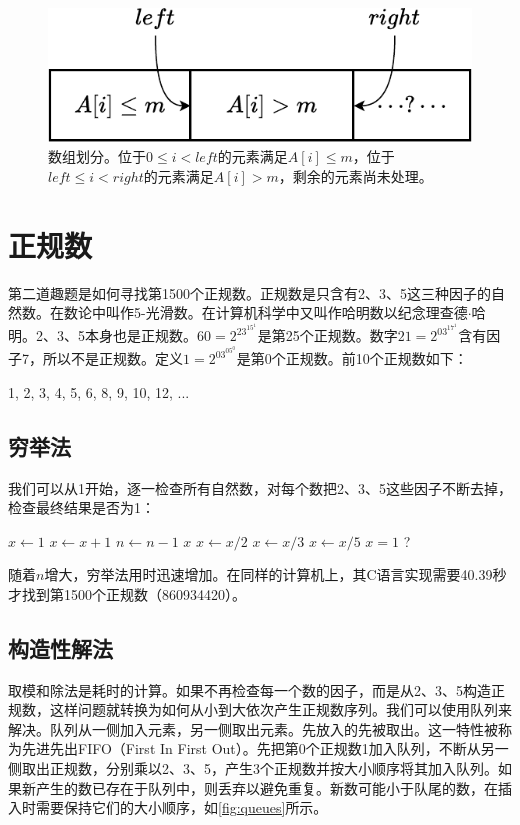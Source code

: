 \documentclass[b5paper]{ctexart}
\begin{document}
\begin{figure}[htbp]
  \centering
  \includegraphics[scale=0.7]{img/partition-by}  %
  \caption{数组划分。位于$0 \leq i < left$的元素满足$A[i] \leq m$，位于$left \leq i < right$的元素满足$A[i] > m$，剩余的元素尚未处理。}
  \label{fig:divide}
\end{figure}

\section*{正规数}

第二道趣题是如何寻找第1500个正规数。正规数是只含有2、3、5这三种因子的自然数。在数论中叫作5-光滑数。在计算机科学中又叫作哈明数以纪念理查德$\cdot$哈明。2、3、5本身也是正规数。$60 = 2^23^15^1$是第25个正规数。数字$21 = 2^03^17^1$含有因子7，所以不是正规数。定义$1=2^03^05^0$是第0个正规数。前10个正规数如下：

1, 2, 3, 4, 5, 6, 8, 9, 10, 12, ...

\subsection*{穷举法}
我们可以从1开始，逐一检查所有自然数，对每个数把2、3、5这些因子不断去掉，检查最终结果是否为1：

\begin{algorithmic}[1]
  \State $x \gets 1$
    \State $x \gets x + 1$
      \State $n \gets n - 1$
    \EndIf
  \EndWhile
  \State \Return $x$
\EndFunction
\Statex
{}
    \State $x \gets x / 2$
  \EndWhile
    \State $x \gets x / 3$
  \EndWhile
    \State $x \gets x / 5$
  \EndWhile
  \State \Return $x = 1$ ?
\EndFunction
\end{algorithmic}

随着$n$增大，穷举法用时迅速增加。在同样的计算机上，其C语言实现需要40.39秒才找到第1500个正规数（860934420）。

\subsection*{构造性解法}
取模和除法是耗时的计算\cite{Bentley}。如果不再检查每一个数的因子，而是从2、3、5构造正规数，这样问题就转换为如何从小到大依次产生正规数序列。我们可以使用队列来解决。队列从一侧加入元素，另一侧取出元素。先放入的先被取出。这一特性被称为先进先出FIFO（First In First Out）。先把第0个正规数1加入队列，不断从另一侧取出正规数，分别乘以2、3、5，产生3个正规数并按大小顺序将其加入队列。如果新产生的数已存在于队列中，则丢弃以避免重复。新数可能小于队尾的数，在插入时需要保持它们的大小顺序，如\cref{fig:queues}所示。
\end{document}
